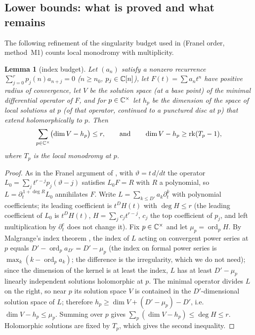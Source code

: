 \documentclass[11pt]{amsart}
\newtheorem{lemma}[theorem]{Lemma}
\theoremstyle{definition}
\theoremstyle{remark}
\begin{document}
\subsection{Lower bounds: what is proved and what remains}\label{R1:sec:lower}

The following refinement of the singularity budget used in \cite{K-006,K-034} (Franel order,
method~M1) counts local monodromy with multiplicity.

\begin{lemma}[index budget]\label{R1:lem:index}
Let $(a_n)$ satisfy a nonzero recurrence $\sum_{j=0}^{r}p_j(n)a_{n+j}=0$ ($n\ge n_0$,
$p_j\in\mathbb{C}[n]$), let $F(t)=\sum a_nt^n$ have positive radius of convergence, let $V$ be
the solution space (at a base point) of the minimal differential operator of $F$, and for
$p\in\mathbb{C}^\times$ let $h_p$ be the dimension of the space of local solutions at $p$ (of
that operator, continued to a punctured disc at $p$) that extend holomorphically to $p$.
Then
\[
\sum_{p\in\mathbb{C}^\times}\bigl(\dim V-h_p\bigr)\le r,\qquad\text{and}\qquad
\dim V-h_p\ge\operatorname{rk}(T_p-1),
\]
where $T_p$ is the local monodromy at $p$.
\end{lemma}

\begin{proof}
As in the Franel argument of \cite{K-006}, with $\vartheta=t\,d/dt$ the operator
$L_0=\sum_jt^{r-j}p_j(\vartheta-j)$ satisfies $L_0F=R$ with $R$ a polynomial, so
$L=\partial_t^{\,1+\deg R}L_0$ annihilates $F$. Write $L=\sum_{k\le D'}a_k\partial_t^k$ with
polynomial coefficients; its leading coefficient is $t^{D}H(t)$ with $\deg H\le r$ (the
leading coefficient of $L_0$ is $t^DH(t)$, $H=\sum_jc_jt^{r-j}$, $c_j$ the top coefficient of
$p_j$, and left multiplication by $\partial_t^e$ does not change it). Fix
$p\in\mathbb{C}^\times$ and let $\mu_p=\operatorname{ord}_pH$. By Malgrange's index theorem
\cite{R1-Malgrange}, the index of $L$ acting on convergent power series at $p$ equals
$D'-\operatorname{ord}_pa_{D'}=D'-\mu_p$ (the index on formal power series is
$\max_k(k-\operatorname{ord}_pa_k)$; the difference is the irregularity, which we do not need);
since the dimension of the kernel is at least the index, $L$ has at least $D'-\mu_p$ linearly
independent solutions holomorphic at $p$. The minimal operator divides $L$ on the right, so
near $p$ its solution space $V$ is contained in the $D'$-dimensional solution space of $L$;
therefore $h_p\ge\dim V+(D'-\mu_p)-D'$, i.e.\ $\dim V-h_p\le\mu_p$. Summing over $p$ gives
$\sum_p(\dim V-h_p)\le\deg H\le r$. Holomorphic solutions are fixed by $T_p$, which gives the
second inequality.
\end{proof}
\end{document}
